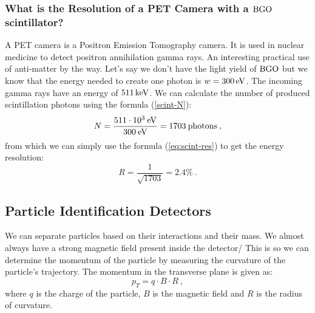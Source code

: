 \documentclass[10pt, titlepage, a4paper]{article}
\numberwithin{equation}{section}
\begin{document}
\subsubsection{What is the Resolution of a PET Camera with a $\rm{BGO}$ scintillator?}
A PET camera is a Positron Emission Tomography camera. It is used in nuclear medicine to detect positron annihilation gamma rays. An interesting 
practical use of anti-matter by the way. Let's say we don't have the light yield of $\rm{BGO}$ but we know that the energy needed to create one photon
is $w=300\,\rm{eV}$. The incoming gamma rays have an energy of $511\,\rm{keV}$. We can calculate the number of produced scintillation photons 
using the formula (\ref{scint-N}):
%
\begin{equation}
    N = \frac{511\cdot10^{3}\>\rm{eV}}{300\>\rm{eV}} = 1703\>\rm{photons}\>,
\end{equation}
%
from which we can simply use the formula (\ref{eq:scint-res}) to get the energy resolution:
%
\begin{equation}
    R = \frac{1}{\sqrt{1703}} = 2.4\%\>.
\end{equation}

\subsection{Particle Identification Detectors}
We can separate particles based on their interactions and their mass. We almost always have a strong magnetic field present
inside the detector/ This is so we can determine the momentum of the particle by measuring the curvature of the particle's trajectory.
The momentum in the transverse plane is given as:
%
\begin{equation}
    p_T = q\cdot B\cdot R\>,
    \label{eq:B-momentum}
\end{equation}
%
where $q$ is the charge of the particle, $B$ is the magnetic field and $R$ is the radius of curvature. 

% 
% 

\end{document}

